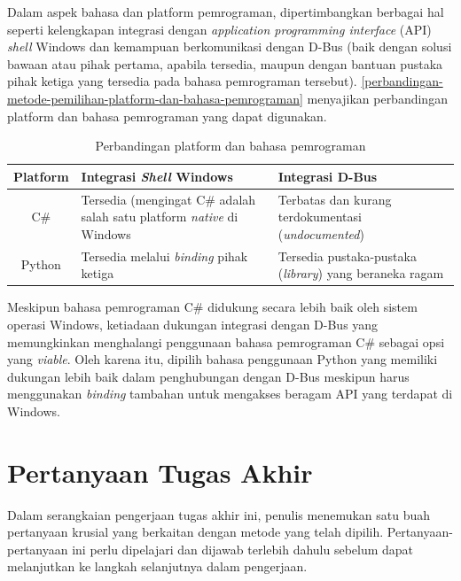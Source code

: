 Dalam aspek bahasa dan platform pemrograman, dipertimbangkan berbagai hal seperti kelengkapan integrasi dengan \textit{application programming interface} (API) \textit{shell} Windows dan kemampuan berkomunikasi dengan D-Bus (baik dengan solusi bawaan atau pihak pertama, apabila tersedia, maupun dengan bantuan pustaka pihak ketiga yang tersedia pada bahasa pemrograman tersebut). \autoref{perbandingan-metode-pemilihan-platform-dan-bahasa-pemrograman} menyajikan perbandingan platform dan bahasa pemrograman yang dapat digunakan.

\begin{table}[h]
    \centering
    \caption{Perbandingan platform dan bahasa pemrograman}
    \label{perbandingan-metode-pemilihan-platform-dan-bahasa-pemrograman}
    \begin{tabularx}{\textwidth}{|c|X|X|} \hline
        \textbf{Platform} & \textbf{Integrasi \textit{Shell} Windows} & \textbf{Integrasi D-Bus}\\ \hline
        C\# & Tersedia (mengingat C\# adalah salah satu platform \textit{native} di Windows & Terbatas dan kurang terdokumentasi (\textit{undocumented})\\ \hline
        Python & Tersedia melalui \textit{binding} pihak ketiga & Tersedia pustaka-pustaka (\textit{library}) yang beraneka ragam\\ \hline
    \end{tabularx}
\end{table}

Meskipun bahasa pemrograman C\# didukung secara lebih baik oleh sistem operasi Windows, ketiadaan dukungan integrasi dengan D-Bus yang memungkinkan menghalangi penggunaan bahasa pemrograman C\# sebagai opsi yang \textit{viable}. Oleh karena itu, dipilih bahasa penggunaan Python yang memiliki dukungan lebih baik dalam penghubungan dengan D-Bus meskipun harus menggunakan \textit{binding} tambahan untuk mengakses beragam API yang terdapat di Windows.

\section{Pertanyaan Tugas Akhir}

Dalam serangkaian pengerjaan tugas akhir ini, penulis menemukan satu buah pertanyaan krusial yang berkaitan dengan metode yang telah dipilih. Pertanyaan-pertanyaan ini perlu dipelajari dan dijawab terlebih dahulu sebelum dapat melanjutkan ke langkah selanjutnya dalam pengerjaan.

